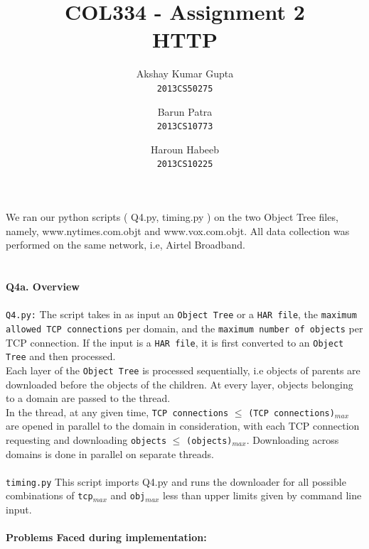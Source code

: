 \documentclass[12pt]{article}
\begin{document}
\title{COL334 - Assignment 2\\ HTTP}
\author{Akshay Kumar Gupta\\\texttt{2013CS50275} \and  Barun Patra\\\texttt{2013CS10773} \and Haroun Habeeb\\\texttt{2013CS10225}}
\date{}
\maketitle
\noindent 
We ran our python scripts ( Q4.py, timing.py ) on the two Object Tree files, namely, www.nytimes.com.objt and www.vox.com.objt. All data collection was performed on the same network, i.e, Airtel Broadband.
\\\\\\
{\bfseries Q4a. Overview} %
\\\\\texttt{Q4.py:} The script takes in as input an \texttt{Object Tree} or a \texttt{HAR file}, the \texttt{maximum allowed TCP connections} per domain, and the \texttt{maximum number of objects} per TCP connection. If the input is a \texttt{HAR file}, it is first converted to an \texttt{Object Tree} and then processed. \\
Each layer of the \texttt{Object Tree} is processed sequentially, i.e objects of parents are downloaded before the objects of the children. At every layer, objects belonging to a domain are passed to the thread.\\
In the thread, at any given time, \texttt{TCP connections} $\leq$ \texttt{(TCP connections)$_{max}$} are opened in parallel to the domain in consideration, with each TCP connection requesting and downloading \texttt{objects} $\leq$ \texttt{(objects)$_{max}$}. Downloading across domains is done in parallel on separate threads.
\\\\
\texttt{timing.py} This script imports Q4.py and runs the downloader for all possible combinations of \texttt{tcp$_{max}$} and \texttt{obj$_{max}$} less than upper limits given by command line input.
~\\\\
\textbf{Problems Faced during implementation:}
\end{document}
